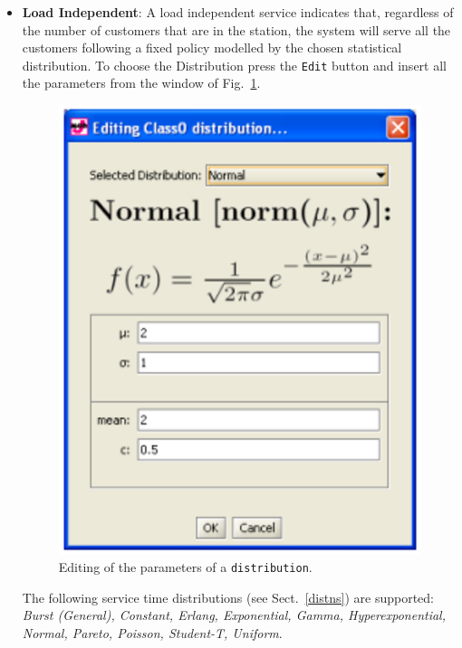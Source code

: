 \begin{itemize}
\item \textbf{Load Independent}: A load independent service
indicates that, regardless of the number of customers that are in
the station, the system will serve all the customers following a
fixed policy modelled by the chosen statistical distribution. To
choose the Distribution press the \texttt{Edit} button and insert
all the parameters from the window of Fig.~\ref{fig:cldistrw}.
\begin{figure}[htb]
    \begin{center}
        \includegraphics[scale=.5]{img/jsimg/8.17.eps}
    \end{center}
    \caption{Editing of the parameters of a \texttt{distribution}.}
    \label{fig:cldistrw}
\end{figure}

The following service time distributions (see Sect.~\ref{distns})
are supported: \emph{Burst (General), Constant, Erlang,
Exponential, Gamma, Hyperexponential, Normal, Pareto, Poisson,
Student-T, Uniform}.


\end{itemize}
